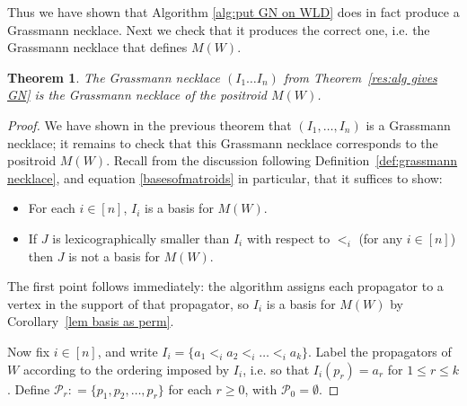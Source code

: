 \documentclass[11pt]{article}
\newcommand{\cP}{\mathcal{P}}
\newcommand{\Prop}{\textrm{Prop}}
\newtheorem{thm}{Theorem}[section]
\theoremstyle{remark}
\theoremstyle{definition}
\begin{document}
Thus we have shown that Algorithm \ref{alg:put GN on WLD} does in fact produce a Grassmann necklace. Next we check that it produces the correct one, i.e. the Grassmann necklace that defines $M(W)$. 
\begin{thm}\label{res alg gives correct GN}
The Grassmann necklace $(I_1 \ldots I_n)$ from Theorem~\ref{res:alg gives GN} is the Grassmann necklace of the positroid $M(W)$.
\end{thm}
\begin{proof}
We have shown in the previous theorem that $(I_1,\dots,I_n)$ is a Grassmann necklace; it remains to check that this Grassmann necklace corresponds to the positroid $M(W)$. Recall from the discussion following Definition~\ref{def:grassmann necklace}, and equation \eqref{basesofmatroids} in particular, that it suffices to show: 
\begin{itemize}
\item For each $i \in [n]$, $I_i$ is a basis for $M(W)$.
\item If $J$ is lexicographically smaller than $I_i$ with respect to $<_i$ (for any $i \in [n]$) then $J$ is not a basis for $M(W)$. 
\end{itemize}
The first point follows immediately: the algorithm assigns each propagator to a vertex in the support of that propagator, so $I_i$ is a basis for $M(W)$ by Corollary~\ref{lem basis as perm}.

Now fix $i \in [n]$, and write $I_i = \{a_1 <_i a_2 <_i \dots <_i a_k\}$. Label the propagators of $W$ according to the ordering imposed by $I_i$, i.e. so that $I_i(p_{r}) = a_{r}$ for $1 \leq r \leq k$. Define $\cP_r: = \{p_1,p_2,\dots,p_r\}$ for each $r\geq 0$, with $\cP_0 = \emptyset$.



\end{proof}
\end{document}
